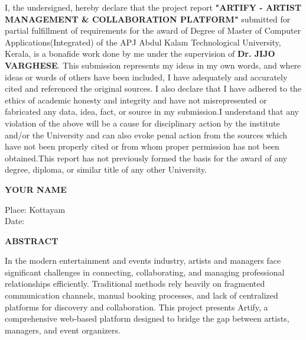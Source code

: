 \documentclass[12pt,a4paper]{report}
\begin{document}
\vspace{1cm}

I, the undersigned, hereby declare that the project report
\textbf{"ARTIFY - ARTIST MANAGEMENT \& COLLABORATION PLATFORM"} submitted for partial
fulfillment of requirements for the award of Degree of Master of Computer Applications(Integrated) of the APJ Abdul Kalam Technological University, Kerala,
is a bonafide work done by me under the supervision of
\textbf{Dr. JIJO VARGHESE}. This submission represents my ideas in my own words, and where ideas or words of others have been included, I have adequately and accurately cited and referenced the original sources. I also declare that I have adhered to the ethics of academic honesty and integrity and have not misrepresented or fabricated any data, idea, fact, or source in my submission.I understand that any violation of the above will be a cause for disciplinary action by the institute and/or the University and can also evoke penal action from the sources which have not been properly cited or from whom proper permission has not been obtained.This report has not previously formed the basis for the award of any degree, diploma, or similar title of any other University.

\vspace{2cm}

\begin{flushright}
\textbf{YOUR NAME}
\end{flushright}

\noindent
Place: Kottayam\\
Date:


\newpage
\thispagestyle{empty}

\begin{center}
{\fontsize{16pt}{18pt}\selectfont\textbf{ABSTRACT}}
\end{center}

\vspace{1cm}

In the modern entertainment and events industry, artists and managers face significant challenges in connecting, collaborating, and managing professional relationships efficiently. Traditional methods rely heavily on fragmented communication channels, manual booking processes, and lack of centralized platforms for discovery and collaboration. This project presents Artify, a comprehensive web-based platform designed to bridge the gap between artists, managers, and event organizers.
\end{document}
